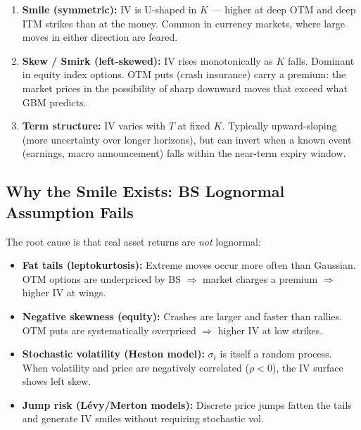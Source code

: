 \documentclass[12pt,a4paper,openany]{report}
\theoremstyle{definition}
\begin{document}
\begin{enumerate}[label=\arabic*.]
  \item \textbf{Smile (symmetric):} IV is U-shaped in $K$ — higher at deep OTM and deep ITM strikes than at the money. Common in currency markets, where large moves in either direction are feared.
  \item \textbf{Skew / Smirk (left-skewed):} IV rises monotonically as $K$ falls. Dominant in equity index options. OTM puts (crash insurance) carry a premium: the market prices in the possibility of sharp downward moves that exceed what GBM predicts.
  \item \textbf{Term structure:} IV varies with $T$ at fixed $K$. Typically upward-sloping (more uncertainty over longer horizons), but can invert when a known event (earnings, macro announcement) falls within the near-term expiry window.
\end{enumerate}

\subsection{Why the Smile Exists: BS Lognormal Assumption Fails}

The root cause is that real asset returns are \emph{not} lognormal:
\begin{itemize}
  \item \textbf{Fat tails (leptokurtosis):} Extreme moves occur more often than Gaussian. OTM options are underpriced by BS $\Rightarrow$ market charges a premium $\Rightarrow$ higher IV at wings.
  \item \textbf{Negative skewness (equity):} Crashes are larger and faster than rallies. OTM puts are systematically overpriced $\Rightarrow$ higher IV at low strikes.
  \item \textbf{Stochastic volatility (Heston model):} $\sigma_t$ is itself a random process. When volatility and price are negatively correlated ($\rho < 0$), the IV surface shows left skew.
  \item \textbf{Jump risk (Lévy/Merton models):} Discrete price jumps fatten the tails and generate IV smiles without requiring stochastic vol.
\end{itemize}
\end{document}
